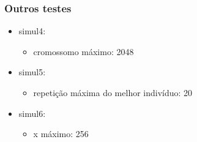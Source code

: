 \documentclass[11pt]{article}
\begin{document}
\subsubsection{Outros testes}
\label{sec-1-4-1}

\begin{itemize}
\item simul4: 
\begin{itemize}
\item cromossomo máximo: 2048
\end{itemize}

\item simul5:
\begin{itemize}
\item repetição máxima do melhor indivíduo: 20
\end{itemize}

\item simul6: 
\begin{itemize}
\item x máximo: 256
\end{itemize}
\end{itemize}
\end{document}
